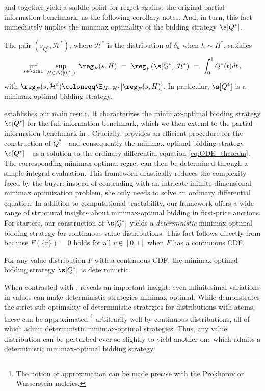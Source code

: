  and  together yield a saddle point for regret against the original partial-information benchmark, as the following corollary notes. And, in turn, this fact immediately implies the minimax optimality of the bidding strategy $\s[Q^*]$.
\begin{corollary}\label{cor:partial-info-saddle}
	The pair $(s_{Q^*}, \mathcal H^*)$, where $\mathcal{H}^*$ is the distribution of $\delta_h$ when $h \sim H^*$, satisfies
    \begin{align*}
        \inf_{s \in \Scal}\ \sup_{H \in \Delta([0,1])}\ \reg_F(s, H)\ =\ \reg_F(\s[Q^*], \mathcal H^*)\ =\   \int_0^1 Q^*(t)dt\,,
    \end{align*}
    with $\reg_F(s, \mathcal H^*) \coloneqq \E_{H \sim \mathcal{H^*}}[\reg_F(s,H)]$. In particular, $\s[Q^*]$ is a minimax-optimal bidding strategy.
\end{corollary}




 establishes our main result. It characterizes the minimax-optimal bidding strategy $\s[Q^*]$ for the full-information benchmark, which we then extend to the partial-information benchmark in . Crucially,  provides an efficient procedure for the construction of $Q^*$---and consequently the minimax-optimal bidding strategy $\s[Q^*]$---as a solution to the ordinary differential equation \eqref{eq:ODE_theorem}. The corresponding minimax-optimal regret can then be determined through a simple integral evaluation. This framework drastically reduces the complexity faced by the buyer: instead of contending with an intricate infinite-dimensional minimax optimization problem, she only needs to solve an ordinary differential equation. In addition to computational tractability, our framework offers a wide range of structural insights about minimax-optimal bidding in first-price auctions. For starters, our construction of $\s[Q^*]$ yields a \emph{deterministic} minimax-optimal bidding strategy for continuous value distributions. This fact follows directly from  because $F(\{v\}) = 0$ holds for all $v \in [0,1]$ when $F$ has a continuous CDF.

\begin{corollary}\label{cor:deterministic-opt-strat}
    For any value distribution $F$ with a continuous CDF, the minimax-optimal bidding strategy $\s[Q^*]$ is deterministic.
\end{corollary}
When contrasted with ,  reveals an important insight: even infinitesimal variations in values can make deterministic strategies minimax-optimal. While  demonstrates the strict sub-optimality of deterministic strategies for distributions with atoms, these can be approximated
\footnote{The notion of approximation can be made precise with the Prokhorov or Wasserstein metrics.} 
arbitrarily well by continuous distributions, all of which admit deterministic minimax-optimal strategies. Thus, any value distribution can be perturbed ever so slightly to yield another one which admits a deterministic minimax-optimal bidding strategy.
   

